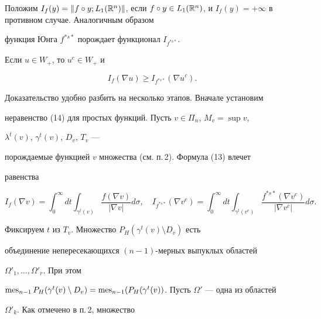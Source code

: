 Положим $I_f(y)=\|f\circ y;L_1(\Bbb R^n)\|$, если $f\circ y\in L_1(\Bbb 


R^n)$, и $I_f(y)=+\infty$ в противном случае. Аналогичным образом 


функция Юнга $f^{*s*}$ порождает функционал $I_{f^{*s*}}$. 


 


\begin{thm} 


Если $u\in W_+$, то $u^c\in W_+$ и 


\begin{equation} 


I_f(\nabla u)\ge I_{f^{*s*}}(\nabla u^c). 


\end{equation} 


\end{thm} 


 


Доказательство удобно разбить на несколько этапов. Вначале установим 


неравенство (14) для простых функций. Пусть $v\in\Pi_n$, $M_v=\sup v$, 


$\lambda^t(v)$, $\gamma^t(v)$, $D_v$, $T_v$ --- 


порождаемые функцией $v$ множества (см. п.\,2). Формула (13) влечет 


равенства 


\begin{equation} 


I_f(\nabla v)=\int^\infty_0 dt\int_{\gamma^t(v)} 


\frac{f(\nabla v)}{|\nabla v|}d\sigma,\quad 


I_{f^{*s*}}(\nabla v^c)=\int^\infty_0 dt 


\int_{\gamma^t(v^c)}\frac{f^{*s*}(\nabla v^c)}{|\nabla v^c|}d\sigma. 


\end{equation} 


Фиксируем $t$ из $T_v$. Множество $P_H(\gamma^t(v)\setminus D_v)$ есть 


объединение непересекающихся $(n-1)$-мерных выпуклых областей 


$\Omega'_1,\dotsc,\Omega'_r$. При этом 


$\mes_{n-1}P_H(\gamma^t(v)\setminus D_v)= 


\mes_{n-1}(P_H(\gamma^t(v))$. Пусть $\Omega'$ --- одна из областей 


$\Omega'_k$. Как отмечено в п.\,2, множество 


